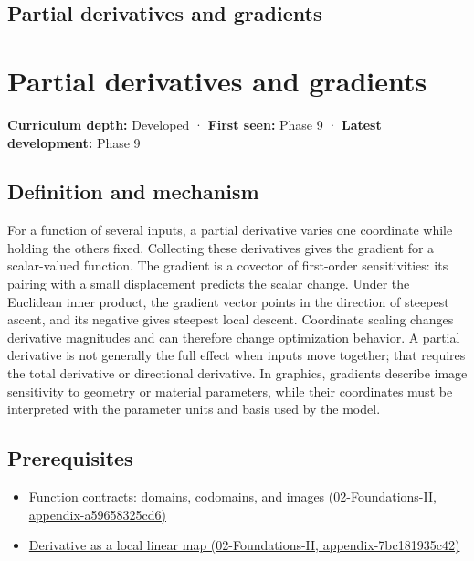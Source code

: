 \hypertarget{appendix-677b59746ae0}{}
\section*{Partial derivatives and gradients}
\chapter{Partial derivatives and gradients}\label{appendix-677b59746ae0-partial-derivatives-and-gradients}

\textbf{Curriculum depth:} Developed · \textbf{First seen:} Phase 9 · \textbf{Latest development:} Phase 9

\section{Definition and mechanism}\label{appendix-677b59746ae0-definition-and-mechanism}

For a function of several inputs, a partial derivative varies one coordinate while holding the others fixed. Collecting these derivatives gives the gradient for a scalar-valued function. The gradient is a covector of first-order sensitivities: its pairing with a small displacement predicts the scalar change. Under the Euclidean inner product, the gradient vector points in the direction of steepest ascent, and its negative gives steepest local descent. Coordinate scaling changes derivative magnitudes and can therefore change optimization behavior. A partial derivative is not generally the full effect when inputs move together; that requires the total derivative or directional derivative. In graphics, gradients describe image sensitivity to geometry or material parameters, while their coordinates must be interpreted with the parameter units and basis used by the model.

\section{Prerequisites}\label{appendix-677b59746ae0-prerequisites}

\begin{itemize}
\tightlist
\item
  \href{../02-Foundations-II/main.pdf\#nameddest=appendix-a59658325cd6}{Function contracts: domains, codomains, and images (02-Foundations-II, appendix-a59658325cd6)}
\item
  \href{../02-Foundations-II/main.pdf\#nameddest=appendix-7bc181935c42}{Derivative as a local linear map (02-Foundations-II, appendix-7bc181935c42)}
\end{itemize}

